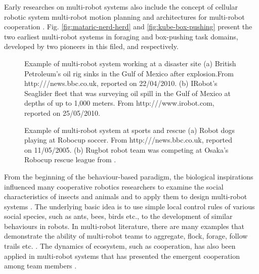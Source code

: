 Early researches on multi-robot systems also include the concept of cellular robotic system \cite{Fukuda+1987,Beni1988} multi-robot motion planning \cite{Arai+1989,Premvuti+1990,Wang1989} and architectures for multi-robot cooperation \cite{Asama+1989}. Fig. \ref{fig:mataric-nerd-herd} and \ref{fig:kube-box-pushing} present the two earliest multi-robot systems in foraging and box-pushing task domains, developed by two pioneers in this filed,  and  respectively.

\begin{figure}
\centering
{} 
\hspace{0.25cm}
\caption{Example of multi-robot system working at a disaster site (a) British Petroleum's oil rig sinks in the Gulf of Mexico after explosion.\protect\newline From http:///news.bbc.co.uk, reported on 22/04/2010. 
(b) IRobot's Seaglider fleet that was surveying oil spill in the Gulf of Mexico at depths of up to 1,000 meters. From http:///www.irobot.com, reported on 25/05/2010.}
\label{fig:bp-oil-disaster}
\end{figure}
\begin{figure}
\centering
{} 
\hspace{0.25cm}
\caption{Example of multi-robot system at sports and rescue (a) Robot dogs playing at Robocup soccer. \protect\newline From http:///news.bbc.co.uk, reported on 11/05/2005. 
(b) Rugbot robot team was competing at Osaka's Robocup rescue league from \protect{}.}
\label{fig:robocup}
\end{figure}
From the beginning of the behaviour-based paradigm, the biological inspirations influenced many cooperative robotics researchers to examine the social characteristics of insects and animals and to apply them to design multi-robot systems \cite{Arkin1998}. The underlying basic idea is to use simple local control rules of various social species, such as ants, bees, birds etc., to the development of similar behaviours in robots. In multi-robot literature, there are many examples that demonstrate the ability of multi-robot teams to aggregate, flock, forage, follow trails etc. \cite{Bonabeau+1999}. The dynamics of ecosystem, such as cooperation, has also been applied in multi-robot systems that has presented the emergent cooperation among team members \cite{Mcfarland1994,Martinoli+1996}. 

